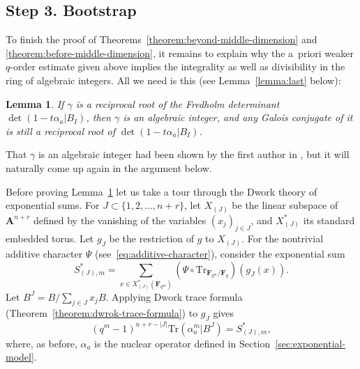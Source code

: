 \documentclass{amsart}
\numberwithin{equation}{section}
\theoremstyle{plain}
\newtheorem{lemma}[equation]{Lemma}
\theoremstyle{definition}
\renewcommand{\mathbb}{\mathbf}
\begin{document}
\subsection*{Step 3. Bootstrap}
\label{bootstrap}
To finish the proof of Theorems~\ref{theorem:beyond-middle-dimension}
and \ref{theorem:before-middle-dimension}, it remains to explain why the
a~priori weaker \(q\)-order estimate given above implies the integrality as
well as divisibility in the ring of algebraic integers. All we need is this (see
Lemma~\ref{lemma:last} below):

\begin{lemma}\label{lemma:last-assertion}
  If \(\gamma\) is a reciprocal root of the
  Fredholm determinant \(\det(1 - t \alpha_{a} | B_I)\), then \(\gamma\) is
  an algebraic integer, and any Galois conjugate of it is still a reciprocal root of
  \(\det(1-t\alpha_{a}| B_I)\).
\end{lemma}

\medskip
That \(\gamma\) is an algebraic integer had been shown by the first author in
\cite[Lemma~3.1]{wan:poles}, but it will naturally come up again in the
argument below.

\medskip
Before proving Lemma~\ref{lemma:last-assertion}
let us take a tour through the Dwork theory of exponential sums.
For \(J \subset \{1,2,\ldots,n+r\}\),
let \(X_{(J)}\) be the linear subspace of \(\mathbb{A}^{n+r}\) defined by the vanishing of
the variables \((x_{j})_{j\in J}\), and \(X_{(J)}^*\) its standard embedded
torus. Let \(g_{J}\) be the restriction of
\(g\) to \(X_{(J)}\).  For the nontrivial additive character \(\Psi\)
(see~\eqref{eq:additive-character}),
consider the exponential sum
\begin{equation*}
  S_{(J),m}^* = \sum_{x\in X_{(J)}^*(\mathbb{F}_{q^m})} (\Psi\circ \mathrm{Tr}_{\mathbb{F}_{q^m}/\mathbb{F}_q})(g_J(x)).
\end{equation*}
Let \(B^J = B/\sum_{j\in J}x_{j}B\).
Applying Dwork trace formula (Theorem~\ref{theorem:dwrok-trace-formula})
to \(g_{J}\) gives
\begin{equation}\label{eq:turnoff-variable-dwork-trace}
  (q^m-1)^{n+r-|J|} \mathrm{Tr}(\alpha_{a}^{m}|{B^J}) = S_{(J),m}^*,
\end{equation}
where, as before, \(\alpha_{a}\) is the nuclear operator defined in
Section~\ref{sec:exponential-model}.
\end{document}
